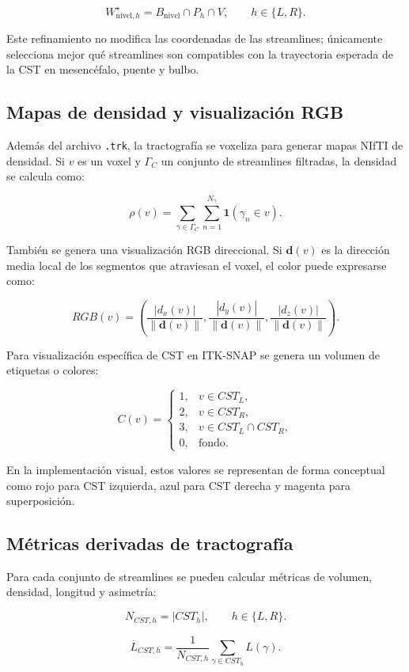 \documentclass[12pt,a4paper]{article}
\begin{document}
\[
W_{\text{nivel},h}^{\star}=B_{\text{nivel}}\cap P_h\cap V,
\qquad
h\in\{L,R\}.
\]

Este refinamiento no modifica las coordenadas de las streamlines; únicamente selecciona mejor qué streamlines son compatibles con la trayectoria esperada de la CST en mesencéfalo, puente y bulbo.

\subsection{Mapas de densidad y visualización RGB}

Además del archivo \texttt{.trk}, la tractografía se voxeliza para generar mapas NIfTI de densidad. Si $v$ es un voxel y $\Gamma_C$ un conjunto de streamlines filtradas, la densidad se calcula como:

\[
\rho(v)=
\sum_{\gamma\in\Gamma_C}
\sum_{n=1}^{N_{\gamma}}
\mathbf{1}\left(\gamma_n\in v\right).
\]

También se genera una visualización RGB direccional. Si $\mathbf{d}(v)$ es la dirección media local de los segmentos que atraviesan el voxel, el color puede expresarse como:

\[
RGB(v)=
\left(
\frac{|d_x(v)|}{\|\mathbf{d}(v)\|},
\frac{|d_y(v)|}{\|\mathbf{d}(v)\|},
\frac{|d_z(v)|}{\|\mathbf{d}(v)\|}
\right).
\]

Para visualización específica de CST en ITK-SNAP se genera un volumen de etiquetas o colores:

\[
C(v)=
\begin{cases}
1, & v\in CST_L,\\
2, & v\in CST_R,\\
3, & v\in CST_L\cap CST_R,\\
0, & \text{fondo}.
\end{cases}
\]

En la implementación visual, estos valores se representan de forma conceptual como rojo para CST izquierda, azul para CST derecha y magenta para superposición.

\subsection{Métricas derivadas de tractografía}

Para cada conjunto de streamlines se pueden calcular métricas de volumen, densidad, longitud y asimetría:

\[
N_{CST,h}=|CST_h|,
\qquad h\in\{L,R\}.
\]

\[
\overline{L}_{CST,h}=\frac{1}{N_{CST,h}}\sum_{\gamma\in CST_h}L(\gamma).
\]
\end{document}
